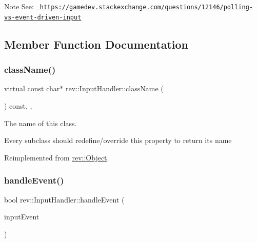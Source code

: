 \begin{DoxyNote}{Note}
See\+: \href{https://gamedev.stackexchange.com/questions/12146/polling-vs-event-driven-input}{\texttt{ https\+://gamedev.\+stackexchange.\+com/questions/12146/polling-\/vs-\/event-\/driven-\/input}} 
\end{DoxyNote}


\subsection{Member Function Documentation}
\mbox{\label{classrev_1_1_input_handler_a2837ab4ed7b6ce53f6aea9faa669021f}} 
\subsubsection{\texorpdfstring{className()}{className()}}
{\footnotesize\ttfamily virtual const char$\ast$ rev\+::\+Input\+Handler\+::class\+Name (\begin{DoxyParamCaption}{ }\end{DoxyParamCaption}) const\hspace{0.3cm}{\ttfamily [inline]}, {\ttfamily [override]}, {\ttfamily [virtual]}}



The name of this class. 

Every subclass should redefine/override this property to return its name 

Reimplemented from \mbox{\hyperlink{classrev_1_1_object_a7a2013f91169479b65cf93afdc5d9a68}{rev\+::\+Object}}.

\mbox{\label{classrev_1_1_input_handler_a0bff1861df9e2f54f8d22ef3b3344009}} 
\subsubsection{\texorpdfstring{handleEvent()}{handleEvent()}}
{\footnotesize\ttfamily bool rev\+::\+Input\+Handler\+::handle\+Event (\begin{DoxyParamCaption}\item[{Q\+Input\+Event $\ast$}]{input\+Event }\end{DoxyParamCaption})}



